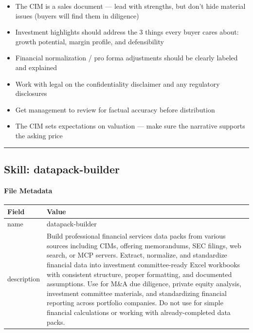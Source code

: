 \documentclass[11pt]{article}
\begin{document}
\begin{itemize}[leftmargin=*,itemsep=2pt,topsep=2pt]
\item {} The CIM is a sales document — lead with strengths, but don't hide material issues (buyers will find them in diligence)
\item {} Investment highlights should address the 3 things every buyer cares about: growth potential, margin profile, and defensibility
\item {} Financial normalization / pro forma adjustments should be clearly labeled and explained
\item {} Work with legal on the confidentiality disclaimer and any regulatory disclosures
\item {} Get management to review for factual accuracy before distribution
\item {} The CIM sets expectations on valuation — make sure the narrative supports the asking price
\end{itemize}

\vspace{0.8em}\hrule\vspace{0.8em}

\subsection{Skill: datapack-builder}\label{file:skills-datapack-builder-SKILL.md}

\paragraph{File Metadata}\mbox{}\par
\begingroup
\small
\setlength{\tabcolsep}{2pt}
\begin{longtable}{>{\RaggedRight\arraybackslash\hspace{0pt}}p{}>{\RaggedRight\arraybackslash\hspace{0pt}}p{}}
\toprule
{} \textbf{Field} & \textbf{Value} \\
\midrule
{} name & datapack-builder \\
{} description & Build professional financial services data packs from various sources including CIMs, offering memorandums, SEC filings, web search, or MCP servers. Extract, normalize, and standardize financial data into investment committee-ready Excel workbooks with consistent structure, proper formatting, and documented assumptions. Use for M\&A due diligence, private equity analysis, investment committee materials, and standardizing financial reporting across portfolio companies. Do not use for simple financial calculations or working with already-completed data packs. \\
\bottomrule
\end{longtable}
\endgroup
\end{document}
